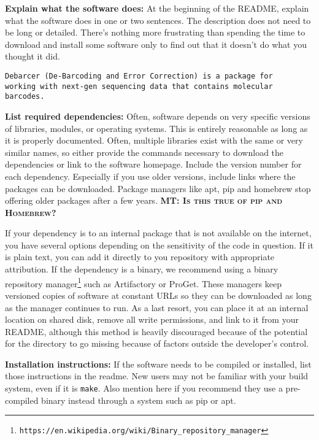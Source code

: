 \documentclass[10pt]{article}
\newcommand{\fixme}[2]{\textsc{\textbf{{#1}: {#2}}}}
\newcommand{\withurl}[2]{{#1}\footnote{\texttt{#2}}}
\begin{document}
\textbf{Explain what the software does:} At the beginning of the README,
explain what the software does in one or two sentences. The description
does not need to be long or detailed. There's nothing more frustrating
than spending the time to download and install some software only to
find out that it doesn't do what you thought it did.

\begin{verbatim}
Debarcer (De-Barcoding and Error Correction) is a package for
working with next-gen sequencing data that contains molecular
barcodes.
\end{verbatim}

\textbf{List required dependencies:} Often, software depends on very
specific versions of libraries, modules, or operating systems. This is
entirely reasonable as long as it is properly documented. Often,
multiple libraries exist with the same or very similar names, so
either provide the commands necessary to download the dependencies or
link to the software homepage. Include the version number for each
dependency.  Especially if you use older versions, include links where
the packages can be downloaded. Package managers like apt, pip and
homebrew stop offering older packages after a few years.
\fixme{MT}{Is this true of pip and Homebrew?}

If your dependency is to an internal package that is not available on
the internet, you have several options depending on the sensitivity of
the code in question. If it is plain text, you can add it directly to
you repository with appropriate attribution. If the dependency is a
binary, we recommend using a
\withurl{binary repository manager}{https://en.wikipedia.org/wiki/Binary\_repository\_manager}
such as Artifactory or ProGet. These managers keep versioned copies of
software at constant URLs so they can be downloaded as long as the
manager continues to run. As a last resort, you can place it at an
internal location on shared disk, remove all write permissions, and
link to it from your README, although this method is heavily
discouraged because of the potential for the directory to go missing
because of factors outside the developer's control.

\textbf{Installation instructions:} If the software needs to be compiled
or installed, list those instructions in the readme. New users may not
be familiar with your build system, even if it is \texttt{make}. Also
mention here if you recommend they use a pre-compiled binary instead
through a system such as pip or apt.
\end{document}
